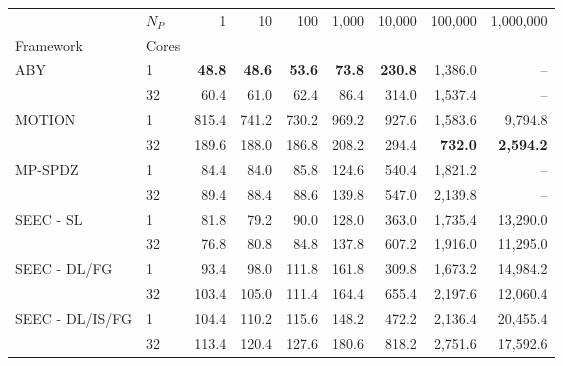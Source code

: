 \begin{tabular}{llrrrrrrr}
\toprule
 & $N_P$ & 1 & 10 & 100 & 1,000 & 10,000 & 100,000 & 1,000,000 \\
Framework & Cores &  &  &  &  &  &  &  \\
\midrule
\multirow[c]{2}{*}{ABY~\cite{DSZ15}} & 1 & \bfseries 48.8 & \bfseries 48.6 & \bfseries 53.6 & \bfseries 73.8 & \bfseries 230.8 & 1,386.0 & -- \\
 & 32 & 60.4 & 61.0 & 62.4 & 86.4 & 314.0 & 1,537.4 & -- \\
\cline{1-9}
\multirow[c]{2}{*}{MOTION~\cite{BDST22}} & 1 & 815.4 & 741.2 & 730.2 & 969.2 & 927.6 & 1,583.6 & 9,794.8 \\
 & 32 & 189.6 & 188.0 & 186.8 & 208.2 & 294.4 & \bfseries 732.0 & \bfseries 2,594.2 \\
\cline{1-9}
\multirow[c]{2}{*}{MP-SPDZ~\cite{CCS:Keller20}} & 1 & 84.4 & 84.0 & 85.8 & 124.6 & 540.4 & 1,821.2 & -- \\
 & 32 & 89.4 & 88.4 & 88.6 & 139.8 & 547.0 & 2,139.8 & -- \\
\cline{1-9}
\multirow[c]{2}{*}{SEEC - SL} & 1 & 81.8 & 79.2 & 90.0 & 128.0 & 363.0 & 1,735.4 & 13,290.0 \\
 & 32 & 76.8 & 80.8 & 84.8 & 137.8 & 607.2 & 1,916.0 & 11,295.0 \\
\cline{1-9}
\multirow[c]{2}{*}{SEEC - DL/FG} & 1 & 93.4 & 98.0 & 111.8 & 161.8 & 309.8 & 1,673.2 & 14,984.2 \\
 & 32 & 103.4 & 105.0 & 111.4 & 164.4 & 655.4 & 2,197.6 & 12,060.4 \\
\cline{1-9}
\multirow[c]{2}{*}{SEEC - DL/IS/FG} & 1 & 104.4 & 110.2 & 115.6 & 148.2 & 472.2 & 2,136.4 & 20,455.4 \\
 & 32 & 113.4 & 120.4 & 127.6 & 180.6 & 818.2 & 2,751.6 & 17,592.6 \\
\bottomrule
\end{tabular}
